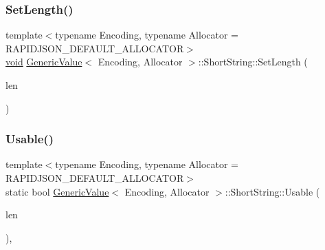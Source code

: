 \mbox{\label{structGenericValue_1_1ShortString_adbfe8461e0cb0ccb2cb3825489e743c2}} 
\subsubsection{\texorpdfstring{Set\+Length()}{SetLength()}}
{\footnotesize\ttfamily template$<$typename Encoding, typename Allocator = R\+A\+P\+I\+D\+J\+S\+O\+N\+\_\+\+D\+E\+F\+A\+U\+L\+T\+\_\+\+A\+L\+L\+O\+C\+A\+T\+OR$>$ \\
\hyperlink{imgui__impl__opengl3__loader_8h_ac668e7cffd9e2e9cfee428b9b2f34fa7}{void} \hyperlink{classGenericValue}{Generic\+Value}$<$ Encoding, Allocator $>$\+::Short\+String\+::\+Set\+Length (\begin{DoxyParamCaption}\item[{\hyperlink{rapidjson_8h_a5ed6e6e67250fadbd041127e6386dcb5}{Size\+Type}}]{len }\end{DoxyParamCaption})\hspace{0.3cm}{\ttfamily [inline]}}

\mbox{\label{structGenericValue_1_1ShortString_a73e40f625c1abbd84f95ac7fff8365f7}} 
\subsubsection{\texorpdfstring{Usable()}{Usable()}}
{\footnotesize\ttfamily template$<$typename Encoding, typename Allocator = R\+A\+P\+I\+D\+J\+S\+O\+N\+\_\+\+D\+E\+F\+A\+U\+L\+T\+\_\+\+A\+L\+L\+O\+C\+A\+T\+OR$>$ \\
static bool \hyperlink{classGenericValue}{Generic\+Value}$<$ Encoding, Allocator $>$\+::Short\+String\+::\+Usable (\begin{DoxyParamCaption}\item[{\hyperlink{rapidjson_8h_a5ed6e6e67250fadbd041127e6386dcb5}{Size\+Type}}]{len }\end{DoxyParamCaption})\hspace{0.3cm}{\ttfamily [inline]}, {\ttfamily [static]}}



